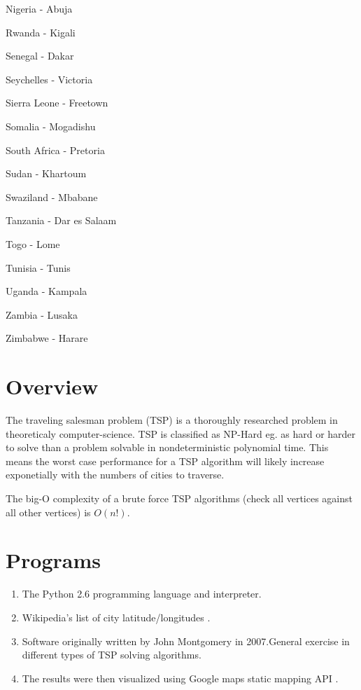 \documentclass[12pt]{article}
\begin{document}
\begin{multicols}{3}
\begin{enumerate*}
\item Nigeria - Abuja
\item Rwanda - Kigali
\item Senegal - Dakar
\item Seychelles - Victoria
\item Sierra Leone - Freetown
\item Somalia - Mogadishu
\item South Africa - Pretoria
\item Sudan - Khartoum
\item Swaziland - Mbabane
\item Tanzania - Dar es Salaam
\item Togo - Lome
\item Tunisia - Tunis
\item Uganda - Kampala
\item Zambia - Lusaka
\item Zimbabwe - Harare
\end{enumerate*}
\end{multicols}

\section{Overview}

  The traveling salesman problem (TSP) is a thoroughly researched problem in theoreticaly computer-science. 
TSP is classified as NP-Hard eg. as hard or harder to solve than a problem solvable in nondeterministic polynomial time.
This means the worst case performance for a TSP algorithm will likely increase exponetially with the numbers of cities to traverse.

The big-O complexity of a brute force TSP algorithms (check all vertices against all other vertices) is $O(n!)$.

\section{Programs}

\begin{enumerate}
\item The Python 2.6 \cite{python} programming language and interpreter.
\item Wikipedia's list of city latitude/longitudes \cite{wiki}.
\item Software originally written by John Montgomery \cite{tsp} in 2007.General exercise in different types of TSP solving algorithms.
\item The results were then visualized using Google maps static mapping API \cite{google}.

\end{enumerate}
\end{document}
